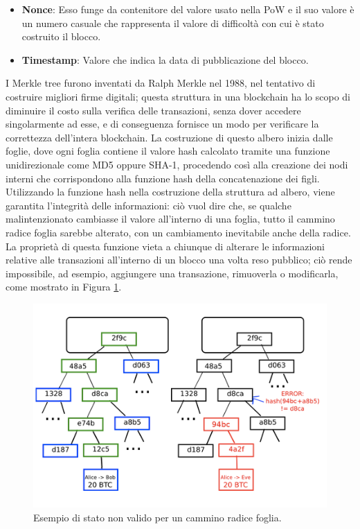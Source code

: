 \begin{itemize}
  \item {\bf Nonce\/}: Esso funge da contenitore del valore usato nella PoW e il suo valore è un numero casuale che rappresenta il valore di difficoltà con cui è stato costruito il blocco.
  \item {\bf Timestamp\/}: Valore che indica la data di pubblicazione del blocco.
\end{itemize}
\leavevmode
\newline
I Merkle tree furono inventati da Ralph Merkle nel 1988, nel tentativo di costruire migliori firme digitali; questa struttura in una blockchain ha lo scopo di diminuire il costo sulla verifica delle transazioni, senza dover accedere singolarmente ad esse, e di conseguenza fornisce un modo per verificare la correttezza dell’intera blockchain.
La costruzione di questo albero inizia dalle foglie, dove ogni foglia contiene il valore hash calcolato tramite una funzione unidirezionale come MD5 oppure SHA-1, procedendo così alla creazione dei nodi interni che corrispondono alla funzione hash della concatenazione dei figli.
Utilizzando la funzione hash nella costruzione della struttura ad albero, viene garantita l’integrità delle informazioni: ciò vuol dire che, se qualche malintenzionato cambiasse il valore all’interno di una foglia, tutto il cammino radice foglia sarebbe alterato, con un cambiamento inevitabile anche della radice.
La proprietà di questa funzione vieta a chiunque di alterare le informazioni relative alle transazioni all’interno di un blocco una volta reso pubblico; ciò rende impossibile, ad esempio, aggiungere una transazione, rimuoverla o modificarla, come mostrato in Figura \ref{fig:merkletree}.

\begin{figure}[H]
\begin{center}
\includegraphics[width=0.6\columnwidth]{images/image-merkle-treepng.png}
\end{center}
\caption{Esempio di stato non valido per un cammino radice foglia. \cite{ethereum:paper}}
\label{fig:merkletree}
\end{figure}
